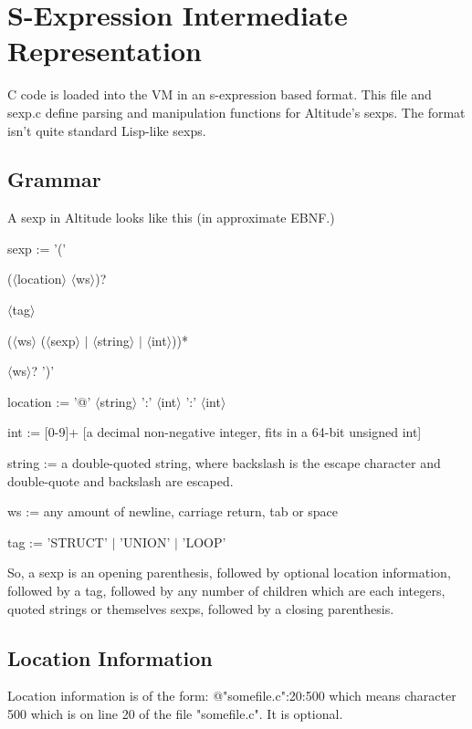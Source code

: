 \chapter{S-Expression Intermediate Representation}
C code is loaded into the VM in an s-expression based format. This file and sexp.c define parsing and manipulation functions for Altitude's sexps. The format isn't quite standard Lisp-like sexps.

\section{Grammar}
A sexp in Altitude looks like this (in approximate EBNF.)
 
\begin{list}{}{}
\item sexp := '(' 
\item ($\langle$location$\rangle$ $\langle$ws$\rangle$)?
\item $\langle$tag$\rangle$
\item ($\langle$ws$\rangle$ ($\langle$sexp$\rangle$ $\vert$ $\langle$string$\rangle$ $\vert$ $\langle$int$\rangle$))*
\item $\langle$ws$\rangle$? ')'
\item
\item location := '@' $\langle$string$\rangle$ ':' $\langle$int$\rangle$ ':' $\langle$int$\rangle$
\item
\item int := [0-9]+ [a decimal non-negative integer, fits in a 64-bit unsigned int]
\item
\item string := a double-quoted string, where backslash is the escape character and double-quote and backslash are escaped.
\item
\item ws := any amount of newline, carriage return, tab or space
\item
\item tag := 'STRUCT' $\vert$ 'UNION' $\vert$ 'LOOP'
\end{list}

So, a sexp is an opening parenthesis, followed by optional location
information, followed by a tag, followed by any number of children
which are each integers, quoted strings or themselves sexps,
followed by a closing parenthesis.

\section{Location Information}
Location information is of the form: @"somefile.c":20:500 which means character 500 which is on line 20 of the file
"somefile.c". It is optional.